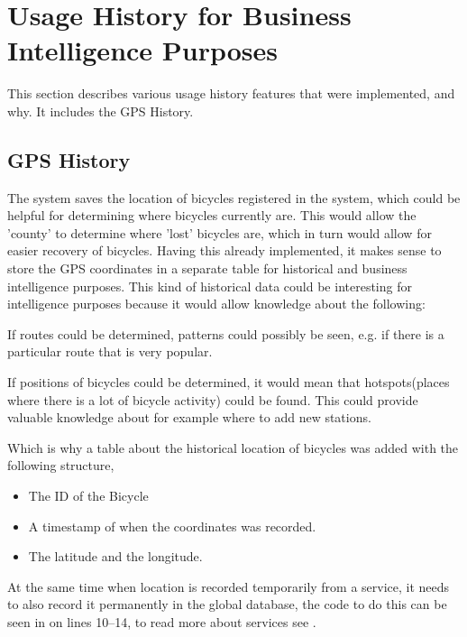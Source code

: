 \section{Usage History for Business Intelligence Purposes}
This section describes various usage history features that were implemented, and why. It includes the GPS History.

\subsection{GPS History}
The system saves the location of bicycles registered in the system, which could be helpful for determining where bicycles currently are. 
This would allow the 'county' to determine where 'lost' bicycles are, which in turn would allow for easier recovery of bicycles.
Having this already implemented, it makes sense to store the GPS coordinates in a separate table for historical and business intelligence purposes.
This kind of historical data could be interesting for intelligence purposes because it would allow knowledge about the following:

\begin{description}[style=nextline]
\item[Which routes are used?] If routes could be determined, patterns could possibly be seen, e.g. if there is a particular route that is very popular.
\item[Are there hotspots for bicycles?] If positions of bicycles could be determined, it would mean that hotspots(places where there is a lot of bicycle activity) could be found. 
This could provide valuable knowledge about for example where to add new stations.
\end{description}

Which is why a table about the historical location of bicycles was added with the following structure,

\begin{itemize}
\item The ID of the Bicycle
\item A timestamp of when the coordinates was recorded.
\item The latitude and the longitude.
\end{itemize}


At the same time when location is recorded temporarily from a service, it needs to also record it permanently in the global database, the code to do this can be seen in  on lines 10--14, to read more about services see .


